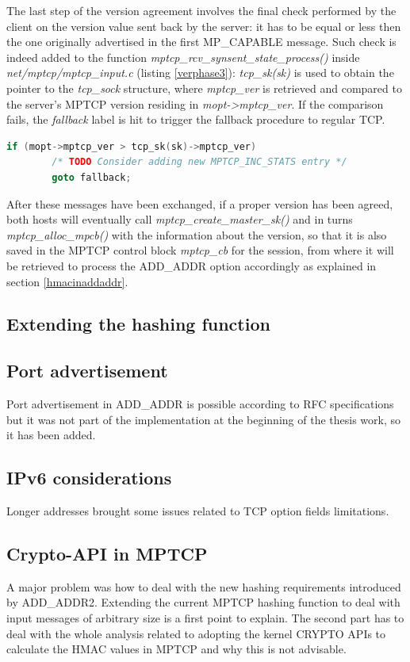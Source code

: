 The last step of the version agreement involves the final check performed by the client on the version value sent back by the server: it has to be equal or less then the one originally advertised in the first MP\_CAPABLE message. Such check is indeed added to the function \textit{mptcp\_rcv\_synsent\_state\_process()} inside \textit{net/mptcp/mptcp\_input.c} (listing \ref{verphase3}): \textit{tcp\_sk(sk)} is used to obtain the pointer to the \textit{tcp\_sock} structure, where \textit{mptcp\_ver} is retrieved and compared to the server's MPTCP version residing in \textit{mopt->mptcp\_ver}. If the comparison fails, the \textit{fallback} label is hit to trigger the fallback procedure to regular TCP.

\begin{lstlisting}[language=c, caption=\textit{MPTCP version agreement, phase 3}, label=verphase3]
	if (mopt->mptcp_ver > tcp_sk(sk)->mptcp_ver)
		/* TODO Consider adding new MPTCP_INC_STATS entry */
		goto fallback;
\end{lstlisting}

After these messages have been exchanged, if a proper version has been agreed, both hosts will eventually call \textit{mptcp\_create\_master\_sk()} and in turns \textit{mptcp\_alloc\_mpcb()} with the information about the version, so that it is also saved in the MPTCP control block \textit{mptcp\_cb} for the session, from where it will be retrieved to process the ADD\_ADDR option accordingly as explained in section \ref{hmacinaddaddr}.


\subsection{Extending the hashing function}
\label{newhash}

\subsection{Port advertisement}
\label{portad}
Port advertisement in ADD\_ADDR is possible according to RFC specifications but it was not part of the implementation at the beginning of the thesis work, so it has been added.

\subsection{IPv6 considerations}
Longer addresses brought some issues related to TCP option fields limitations.

\subsection{Crypto-API in MPTCP}
A major problem was how to deal with the new hashing requirements introduced by ADD\_ADDR2. Extending the current MPTCP hashing function to deal with input messages of arbitrary size is a first point to explain. The second part has to deal with the whole analysis related to adopting the kernel CRYPTO APIs to calculate the HMAC values in MPTCP and why this is not advisable.


